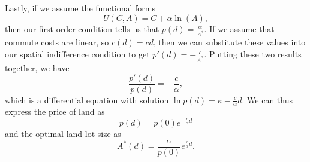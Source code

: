 Lastly, if we assume the functional forms
$$U(C, A) = C + \alpha \ln(A),$$
then our first order condition tells us that $p(d) = \frac{\alpha}{A^*}.$
If we assume that commute costs are linear, so $c(d) = cd$, then we can substitute these values into our spatial indifference condition to get 
$p'(d) = -\frac{c}{A^*}.$
Putting these two results together, we have
$$\frac{p'(d)}{p(d)} = -\frac{c}{\alpha},$$
which is a differential equation with solution $\ln p(d) = \kappa - \frac{c}{\alpha} d.$
We can thus express the price of land as 
$$p(d) = p(0)e^{-\frac{c}{\alpha}d}$$
and the optimal land lot size as
$$A^*(d) = \frac{\alpha}{p(0)}e^{\frac{c}{\alpha}d}.$$
